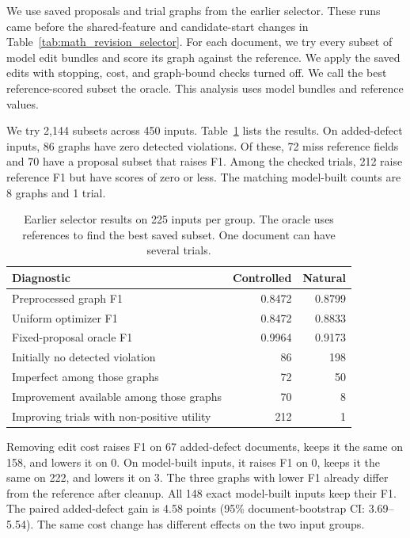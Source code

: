 We use saved proposals and trial graphs from the earlier selector.
These runs came before the shared-feature and candidate-start changes in
Table~\ref{tab:math_revision_selector}. For each document, we try every
subset of model edit bundles and score its graph against the reference.
We apply the saved edits with stopping, cost, and graph-bound checks turned
off. We call the best reference-scored subset the oracle.
This analysis uses model bundles and reference values.

We try 2,144 subsets across 450 inputs.
Table~\ref{tab:selection_bottlenecks} lists the results.
On added-defect inputs, 86 graphs have zero detected violations.
Of these, 72 miss reference fields and 70 have a proposal subset that raises
F1. Among the checked trials, 212 raise reference F1 but have scores of zero
or less. The matching model-built counts are 8 graphs and 1 trial.

\begin{table}[t]
\centering
\caption{Earlier selector results on 225 inputs per group. The oracle uses references to find the best saved subset. One document can have several trials.}
\label{tab:selection_bottlenecks}
\small
\begin{tabular}{lrr}
\toprule
Diagnostic & Controlled & Natural \\
\midrule
Preprocessed graph F1 & 0.8472 & 0.8799 \\
Uniform optimizer F1 & 0.8472 & 0.8833 \\
Fixed-proposal oracle F1 & 0.9964 & 0.9173 \\
Initially no detected violation & 86 & 198 \\
Imperfect among those graphs & 72 & 50 \\
Improvement available among those graphs & 70 & 8 \\
Improving trials with non-positive utility & 212 & 1 \\
\bottomrule
\end{tabular}
\end{table}

Removing edit cost raises F1 on 67 added-defect documents, keeps it the same
on 158, and lowers it on 0. On model-built inputs, it raises F1 on 0,
keeps it the same on 222, and lowers it on 3.
The three graphs with lower F1 already differ from the reference after
cleanup. All 148 exact model-built inputs keep their F1.
The paired added-defect gain is 4.58 points
(95\% document-bootstrap CI: 3.69--5.54).
The same cost change has different effects on the two input groups.

